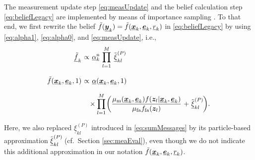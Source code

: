 \documentclass[10pt, twoside, romanappendices]{IEEEtran}
\providecommand{\ist}{\hspace*{.3mm}}
\providecommand{\rmv}{\hspace*{-.3mm}}
\providecommand{\nn}{\nonumber}
\begin{document}
The measurement update step \eqref{eq:measUpdate} and the belief calculation step \eqref{eq:beliefLegacy} are implemented by means of importance sampling \cite{AruMasGorCla:02, DouFreGor:01}. To that end, we first rewrite the \vspace{-.4mm} belief $\tilde{f}(\underline{\bm{y}}_{k}) = \tilde{f}(\underline{\bm{x}}_{k}, \underline{\bm{e}}_{k}, \underline{r}_{k})$ 
in \eqref{eq:beliefLegacy} by \vspace{1mm} using \eqref{eq:alpha1}, \eqref{eq:alpha0}, and \eqref{eq:measUpdate}, i.e., 
\begin{align}
\underline{\tilde{f}}_{k} &\ist\propto\ist \underline{\alpha}^{\mathrm{n}}_k  \ist\ist \prod^{M}_{l=1}  \ist\ist\ist  \tilde{\underline{\xi}}_{kl}^{(P)}  \nn \\[3mm]
\hspace{-.1mm}\tilde{f}(\underline{\V{x}}_{k},\underline{\V{e}}_{k},1) &\ist\propto\ist \underline{\alpha}(\underline{\V{x}}_{k},\underline{\V{e}}_{k},1)   \label{eq:approxbelief_1}\\[2.5mm]
&\hspace{3.5mm}\times\prod^{M}_{l=1} \rmv \bigg(  \frac{\mu_{\mathrm{m}}(\underline{\V{x}}_{k},\underline{\V{e}}_{k}) f(\V{z}_{l}| \underline{\V{x}}_k, \underline{\V{e}}_{k})}{\mu_{\mathrm{fa}}  f_{\mathrm{fa}}(\V{z}_{l})} \ist + \ist \tilde{\underline{\xi}}_{kl}^{(P)} \rmv \bigg) \nn.\\[-4mm]
\nn
\end{align}
Here, we also \vspace{-1mm} replaced $\underline{\xi}_{kl}^{(P)}$ introduced in \eqref{eq:sumMessages} by its\vspace{1.5mm} particle-based approximation $\tilde{\underline{\xi}}_{kl}^{(P)}\rmv\rmv$ (cf.~Section \ref{sec:meaEval}), even\vspace{.5mm} though we do not indicate this additional 
approximation in our notation $\tilde{f}(\underline{\bm{x}}_{k},\underline{\bm{e}}_{k},\underline{r}_{k}) $. 
\end{document}
